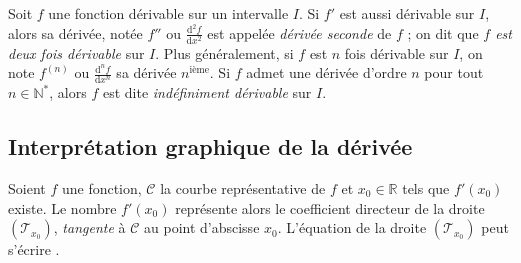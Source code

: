       \begin{defi}
            Soit $f$ une fonction d\'erivable sur un intervalle $I$.
            Si $f'$ est aussi d\'erivable sur $I$, alors sa d\'eriv\'ee, 
            not\'ee $f''$ ou $\frac{\mathrm{d}^2f}{\mathrm{d}x^2}$ est appel\'ee
            \emph{d\'eriv\'ee seconde} de $f$ ; on dit que \emph{$f$ est deux fois d\'erivable} sur $I$.
            Plus g\'en\'eralement, si $f$ est $n$ fois d\'erivable sur $I$, 
            on note $f^{(n)}$ ou $\frac{\mathrm{d}^nf}{\mathrm{d}x^n}$
            sa d\'eriv\'ee $n^{\text{i\`eme}}$.
            Si $f$ admet une d\'eriv\'ee d'ordre $n$ pour tout $n\in \mathbb{N}^*$, alors $f$ est dite
            \emph{ind\'efiniment d\'erivable} sur $I$.
      \end{defi}
            
      \subsection{Interpr\'etation graphique de la d\'eriv\'ee}
            Soient $f$ une fonction, 
            $\mathscr{C}$ la courbe repr\'esentative de $f$ 
            et $x_0\in \mathbb{R}$
            tels que $f'(x_0)$ existe.
            Le nombre $f'(x_0)$ repr\'esente alors 
            le coefficient directeur de la droite $(\mathscr{T}_{x_0})$, 
            \emph{tangente} \`a $\mathscr{C}$ au point d'abscisse $x_0$.
            L'\'equation de la droite $(\mathscr{T}_{x_0})$ peut s'\'ecrire
            .

